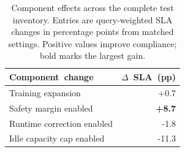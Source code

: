\begin{table}[!t]\caption{Component effects across the complete test inventory. Entries are query-weighted SLA changes in percentage points from matched settings. Positive values improve compliance; bold marks the largest gain.}\label{tab:ablation}\centering\scriptsize
\begin{tabular*}{\columnwidth}{@{\extracolsep{\fill}}lr@{}}\toprule
\mbox{Component change} & \mbox{$\Delta$ SLA (pp)}\\\midrule
Training expansion & +0.7\\
Safety margin enabled & \textbf{+8.7}\\
Runtime correction enabled & -1.8\\
Idle capacity cap enabled & -11.3\\
\bottomrule\end{tabular*}\end{table}
